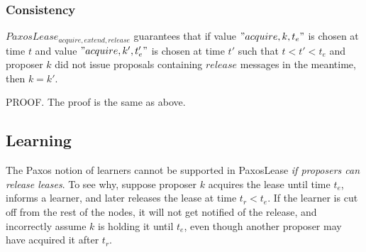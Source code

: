 \documentclass[12pt]{article}
\begin{document}
\subsubsection{ Consistency } $PaxosLease_{acquire, extend, release}$ guarantees that if value $"acquire, k, t_e"$ is chosen at time $t$ and value $"acquire, k', t_e'"$ is chosen at time $t'$ such that $t < t' < t_e$ and proposer $k$ did not issue proposals containing $release$ messages in the meantime, then $k = k'$.

PROOF. The proof is the same as above. %





\subsection{ Learning }

The Paxos notion of learners cannot be supported in PaxosLease \emph{if proposers can release leases}. To see why, suppose proposer $k$ acquires the lease until time $t_e$, informs a learner, and later releases the lease at time $t_r < t_e$. If the learner is cut off from the rest of the nodes, it will not get notified of the release, and incorrectly assume $k$ is holding it until $t_e$, even though another proposer may have acquired it after $t_r$.
\end{document}
